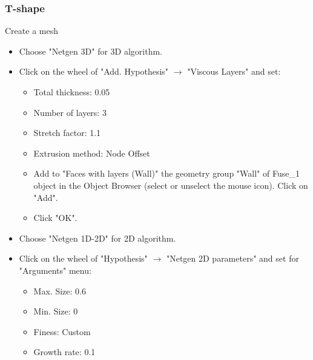 \documentclass[10pt, hyperref={unicode=true,pdfusetitle, bookmarks=true,bookmarksnumbered=false,bookmarksopen=false, breaklinks=false,pdfborder={0 0l 1},backref=true,colorlinks=true,linkcolor=darkblue,pageanchor}]{beamer}
\begin{document}
\begin{frame}
\frametitle{T-shape}
\begin{block}{Create a mesh}

\begin{itemize}
\item Choose "Netgen 3D" for 3D algorithm.
\item Click on the wheel of "Add. Hypothesis" $\rightarrow$ "Viscous Layers" and set:
    \begin{itemize}
    \item [$\circ$] Total thickness: 0.05
    \item [$\circ$] Number of layers: 3
    \item [$\circ$] Stretch factor: 1.1
    \item [$\circ$] Extrusion method: Node Offset
    \item [$\circ$] Add to "Faces with layers (Wall)" the geometry group "Wall" of Fuse\_1 object in the Object Browser (select or unselect the mouse icon). Click on "Add".
    \item [$\circ$] Click "OK".
    \end{itemize}
\item Choose "Netgen 1D-2D" for 2D algorithm.
\item Click on the wheel of "Hypothesis" $\rightarrow$ "Netgen 2D parameters" and set for "Arguments" menu:
    \begin{itemize}
    \item [$\circ$] Max. Size: 0.6
    \item [$\circ$] Min. Size: 0
    \item [$\circ$] Finess: Custom
    \item [$\circ$] Growth rate: 0.1
    \end{itemize}

\end{itemize}

\end{block}
\end{frame}
\end{document}
